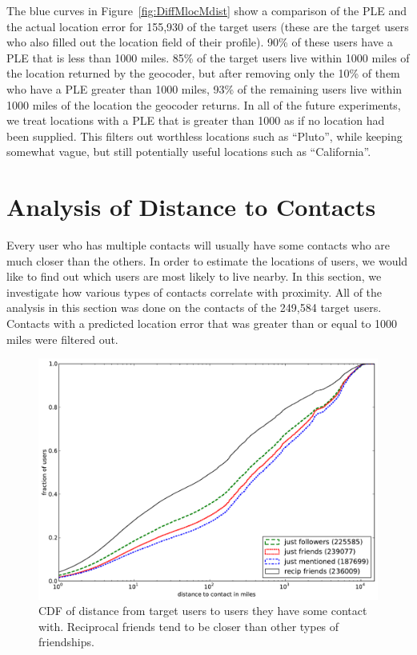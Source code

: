 \documentclass[letterpaper]{article}
\newcommand{\flchap}[1]{\section{#1}}
\begin{document}
The blue curves in Figure~\ref{fig:DiffMlocMdist} show a comparison of the PLE
and the actual location error for 155,930 of the target users (these are the
target users who also filled out the location field of their profile).
%
90\% of these users have a PLE that is less than 1000 miles.
%
85\% of the target users live within 1000 miles of the location returned by
the geocoder, but after removing only the 10\% of them who have a PLE greater
than 1000 miles, 93\% of the remaining users live within 1000 miles of the
location the geocoder returns.
%
In all of the future experiments, we treat locations with a PLE that is greater
than 1000 as if no location had been supplied.
%
This filters out worthless locations such as ``Pluto'', while keeping somewhat
vague, but still potentially useful locations such as ``California''.

\flchap{Analysis of Distance to Contacts}
\label{sec:analysis}

Every user who has multiple contacts will usually have some contacts who are
much closer than the others.
%
In order to estimate the locations of users, we would like
to find out which users are most likely to live nearby.
%
In this section, we investigate how various types of contacts correlate with
proximity.
%
All of the analysis in this section was done on the contacts of the 249,584
target users.
%
Contacts with a predicted location error that was greater than or equal to 1000
miles were filtered out.

\begin{figure}[tbh]
\centering
\includegraphics[width=\linewidth]{figures/edge_types_cuml.pdf}
\caption{
CDF of distance from target users to users they have some contact
with.
%
Reciprocal friends tend to be closer than other types of friendships.
}
\label{fig:EdgeTypesCuml}
\end{figure}
\end{document}
